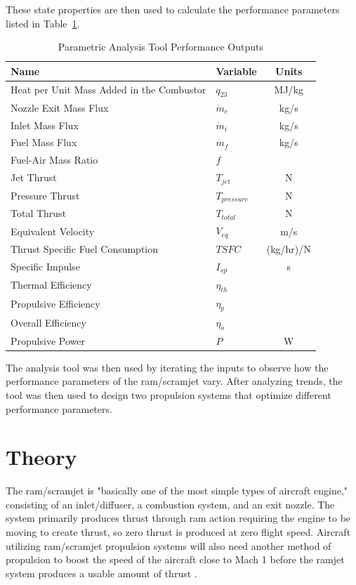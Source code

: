 \documentclass[conf]{new-aiaa} %
\begin{document}
These state properties are then used to calculate the performance parameters listed in Table~\ref{tab:perf_outputs}.

\begin{table}[hbt!] %
    \caption{\label{tab:perf_outputs} Parametric Analysis Tool Performance Outputs}
    \centering
    \begin{tabular}{llc}
        \hline
        Name& Variable& Units\\\hline
        Heat per Unit Mass Added in the Combustor& $q_{23}$& MJ/kg\\
        Nozzle Exit Mass Flux& $\dot m_e$& kg/s\\
        Inlet Mass Flux& $\dot m_i$& kg/s\\
        Fuel Mass Flux& $\dot m_f$& kg/s\\
        Fuel-Air Mass Ratio& $f$\\
        Jet Thrust& $T_{jet}$& N\\
        Pressure Thrust& $T_{pressure}$& N\\
        Total Thrust& $T_{total}$& N\\
        Equivalent Velocity& $V_{eq}$& m/s\\
        Thrust Specific Fuel Consumption& $TSFC$& (kg/hr)/N\\
        Specific Impulse& $I_{sp}$& s\\
        Thermal Efficiency& $\eta_{th}$\\
        Propulsive Efficiency& $\eta_p$\\
        Overall Efficiency& $\eta_o$\\
        Propulsive Power& $P$& W\\
        \hline
    \end{tabular}
\end{table}

The analysis tool was then used by iterating the inputs to observe how the performance parameters of the ram/scramjet vary. After analyzing trends, the tool was then used to design two propulsion systems that optimize different performance parameters.


\section{Theory}
The ram/scramjet is "basically one of the most simple types of aircraft engine," consisting of an inlet/diffuser, a combustion system, and an exit nozzle. The system primarily produces thrust through ram action requiring the engine to be moving to create thrust, so zero thrust is produced at zero flight speed. Aircraft utilizing ram/scramjet propulsion systems will also need another method of propulsion to boost the speed of the aircraft close to Mach 1 before the ramjet system produces a usable amount of thrust \cite{nasa1956ramjetperformance}.
\end{document}

